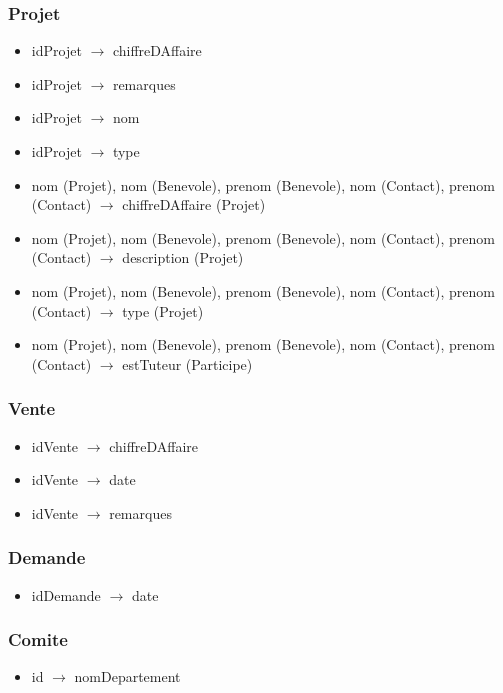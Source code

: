 \subsubsection*{Projet}
\begin{itemize}
\item[] idProjet $\rightarrow$ chiffreDAffaire
\item[] idProjet $\rightarrow$ remarques
\item[] idProjet $\rightarrow$ nom
\item[] idProjet $\rightarrow$ type
\item[]	nom (Projet), nom (Benevole), prenom (Benevole), nom (Contact), prenom (Contact) $\rightarrow$ chiffreDAffaire (Projet)
\item[]	nom (Projet), nom (Benevole), prenom (Benevole), nom (Contact), prenom (Contact) $\rightarrow$ description (Projet)
\item[]	nom (Projet), nom (Benevole), prenom (Benevole), nom (Contact), prenom (Contact) $\rightarrow$ type (Projet)
\item[]	nom (Projet), nom (Benevole), prenom (Benevole), nom (Contact), prenom (Contact) $\rightarrow$ estTuteur (Participe)
\end{itemize}

\subsubsection*{Vente}
\begin{itemize}
\item[]	idVente $\rightarrow$ chiffreDAffaire
\item[]	idVente $\rightarrow$ date
\item[]	idVente $\rightarrow$ remarques
\end{itemize}

\subsubsection*{Demande}
\begin{itemize}
\item[] idDemande $\rightarrow$ date
\end{itemize}

\subsubsection*{Comite}
\begin{itemize}
\item[] id $\rightarrow$ nomDepartement
\end{itemize}

